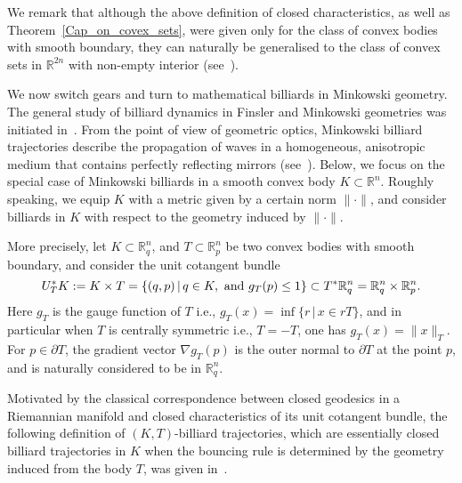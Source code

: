 \documentclass[11pt]{article}
\begin{document}
{We remark that although the above definition of closed characteristics, as well as Theorem~\ref{Cap_on_covex_sets}, 
were given only for the class of convex bodies with smooth boundary, they can naturally be generalised 
to the class of convex sets in ${\mathbb R}^{2n}$ with non-empty interior  (see~\cite{AAO1}). 



We now switch gears and turn to mathematical billiards in Minkowski geometry.
The general study of billiard dynamics in Finsler  and Minkowski
geometries was initiated in~\cite{GT}. From the point of view of geometric optics, Minkowski billiard
trajectories describe the propagation of waves in a homogeneous,
anisotropic medium that contains perfectly reflecting mirrors (see~\cite{GT}).
Below, we focus on the special case of Minkowski billiards in a smooth convex
body  $K \subset {\mathbb R}^n$. Roughly speaking, we equip $K$
with a metric given by a certain norm $\| \cdot \|$, and
consider billiards in $K$ with respect to the geometry induced by $\|
\cdot \|$.


More precisely, let $K \subset {\mathbb R}^n_q$, and $T \subset {\mathbb R}^n_p$ be two convex bodies with smooth boundary, and consider the 
unit cotangent bundle
\begin{equation*}
U_T^*K := K \times T = \{ (q,p) \, | \, q \in K, \ {\rm and} \
g_T(p)  \leq 1 \} \subset T^* {\mathbb R}^n_q  = {\mathbb R}^{n}_q
\times  {\mathbb R}^{n}_p. \end{equation*} Here $g_T$ is the gauge function of $T$ i.e., $g_T(x) = \inf \{r \, | \, x \in rT \}$, and in particular when $T$ is centrally symmetric i.e., $T=-T$, one has $g_T(x) = \|x\|_T$.
For $p \in \partial T$, the gradient vector $\nabla g_T(p)$ is the outer normal to $\partial T$ at the point $p$,  and is naturally considered to be in $\mathbb R^n_q$.


Motivated by the classical correspondence between closed
geodesics in a Riemannian manifold  and closed
characteristics of its unit cotangent bundle, the following definition of 
$(K,T)$-billiard trajectories, which are essentially closed billiard trajectories in $K$ when the bouncing rule
is determined by the geometry induced from the body $T$, was given in~\cite{AAO1}.

}
\end{document}
